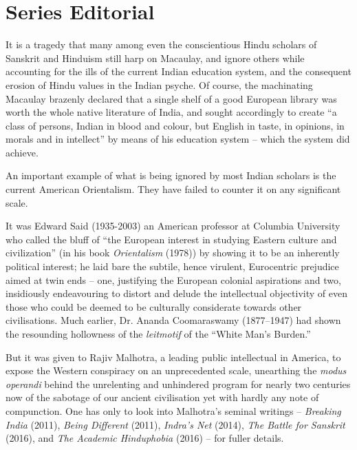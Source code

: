 
\chapter*{Series Editorial}\label{serieseditorial}

It is a tragedy that many among even the conscientious Hindu scholars of Sanskrit and Hinduism still harp on Macaulay, and ignore others while accounting for the ills of the current Indian education system, and the consequent erosion of Hindu values in the Indian psyche. Of course, the machinating Macaulay brazenly declared that a single shelf of a good European library was worth the whole native literature of India, and sought accordingly to create “a class of persons, Indian in blood and colour, but English in taste, in opinions, in morals and in intellect” by means of his education system – which the system did achieve. 

An important example of what is being ignored by most Indian scholars is the current American Orientalism. They have failed to counter it on any significant scale. 

It was Edward Said (1935-2003) an American professor at Columbia University who called the bluff of “the European interest in studying Eastern culture and civilization” (in his book \textit{Orientalism} (1978)) by showing it to be an inherently political interest; he laid bare the subtile, hence virulent, Eurocentric prejudice aimed at twin ends – one, justifying the European colonial aspirations and two, insidiously endeavouring to distort and delude the intellectual objectivity of even those who could be deemed to be culturally considerate towards other civilisations. Much earlier, Dr. Ananda Coomaraswamy (1877–1947) had shown the resounding hollowness of the \textit{leitmotif} of the “White Man’s Burden.” 

But it was given to Rajiv Malhotra, a leading public intellectual in America, to expose the Western conspiracy on an unprecedented scale, unearthing the \textit{modus operandi} behind the unrelenting and unhindered program for nearly two centuries now of the sabotage of our ancient civilisation yet with hardly any note of compunction. One has only to look into Malhotra’s seminal writings – \textit{Breaking India} (2011), \textit{Being Different} (2011), \textit{Indra’s Net} (2014), \textit{The Battle for Sanskrit} (2016), and \textit{The Academic Hinduphobia} (2016) – for fuller details.

